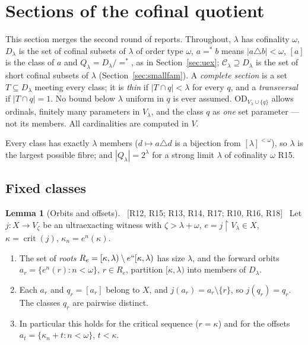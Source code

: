 \documentclass[11pt,letterpaper]{article}
\theoremstyle{definition}
\newtheorem{lemma}[definition]{Lemma}
\numberwithin{equation}{section}
\newcommand{\OD}{\mathrm{OD}}
\newcommand{\crit}{\operatorname{crit}}
\newcommand{\restr}{\mathbin{\upharpoonright}}
\newcommand{\Clam}{\mathcal C_\lambda}
\newcommand{\src}[1]{\unskip\ {\normalfont\small\sffamily\color{Olive}[#1]}\ }
\newcommand{\R}[1]{\textsf{R#1}}
\begin{document}
\section{Sections of the cofinal quotient}\label{sec:quot}

This section merges the second round of reports. Throughout, $\lambda$ has cofinality $\omega$, $D_\lambda$ is the set of cofinal subsets of $\lambda$ of order type $\omega$, $a=^*b$ means $|a\triangle b|<\omega$, $[a]$ is the class of $a$ and $Q_\lambda=D_\lambda/{=^*}$, as in Section~\ref{sec:uex}; $\Clam\supseteq D_\lambda$ is the set of short cofinal subsets of $\lambda$ (Section~\ref{sec:smallfam}). A \emph{complete section} is a set $T\subseteq D_\lambda$ meeting every class; it is \emph{thin} if $|T\cap q|<\lambda$ for every $q$, and a \emph{transversal} if $|T\cap q|=1$. No bound below $\lambda$ uniform in $q$ is ever assumed. $\OD_{V_\lambda\cup\{q\}}$ allows ordinals, finitely many parameters in $V_\lambda$, and the class $q$ as \emph{one} set parameter --- not its members. All cardinalities are computed in $V$.

Every class has exactly $\lambda$ members ($d\mapsto a\triangle d$ is a bijection from $[\lambda]^{<\omega}$), so $\lambda$ is the largest possible fibre; and $|Q_\lambda|=2^\lambda$ for a strong limit $\lambda$ of cofinality $\omega$ \R{15}.

\subsection{Fixed classes}

\begin{lemma}[Orbits and offsets]\label{lem:orbits}\src{R12, R15; R13, R14, R17; R10, R16, R18}
Let $j:X\to V_\zeta$ be an ultraexacting witness with $\zeta>\lambda+\omega$, $e=j\restr V_\lambda\in X$, $\kappa=\crit(j)$, $\kappa_n=e^n(\kappa)$.
\begin{enumerate}
\item The set of \emph{roots} $R_e=[\kappa,\lambda)\setminus e``[\kappa,\lambda)$ has size $\lambda$, and the forward orbits $a_r=\{e^n(r):n<\omega\}$, $r\in R_e$, partition $[\kappa,\lambda)$ into members of $D_\lambda$.
\item Each $a_r$ and $q_r=[a_r]$ belong to $X$, and $j(a_r)=a_r\setminus\{r\}$, so $j(q_r)=q_r$. The classes $q_r$ are pairwise distinct.
\item In particular this holds for the critical sequence ($r=\kappa$) and for the offsets $a_t=\{\kappa_n+t:n<\omega\}$, $t<\kappa$.
\end{enumerate}
\end{lemma}
\end{document}
